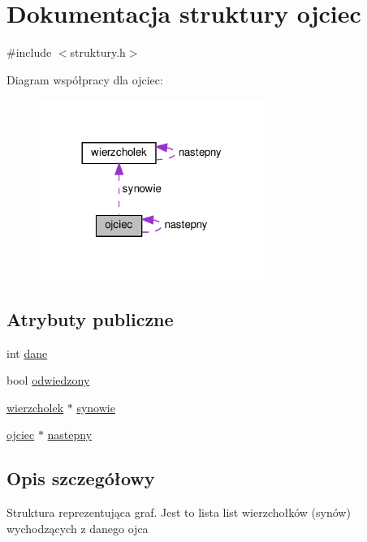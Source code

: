 \hypertarget{structojciec}{}\section{Dokumentacja struktury ojciec}
\label{structojciec}


{\ttfamily \#include $<$struktury.\+h$>$}



Diagram współpracy dla ojciec\+:\nopagebreak
\begin{figure}[H]
\begin{center}
\leavevmode
\includegraphics[width=209pt]{structojciec__coll__graph}
\end{center}
\end{figure}
\subsection*{Atrybuty publiczne}
\begin{DoxyCompactItemize}
\item 
int \hyperlink{structojciec_a00cd793091881a3fe5244e47248c674e}{dane}
\item 
bool \hyperlink{structojciec_ab6946ed8062440756408c1608c9614da}{odwiedzony}
\item 
\hyperlink{structwierzcholek}{wierzcholek} $\ast$ \hyperlink{structojciec_a73c0e6fc33374aea30d4b54a0a636d04}{synowie}
\item 
\hyperlink{structojciec}{ojciec} $\ast$ \hyperlink{structojciec_a80e11ec3ccb56da59f2145a171e8e436}{nastepny}
\end{DoxyCompactItemize}


\subsection{Opis szczegółowy}
Struktura reprezentująca graf. Jest to lista list wierzchołków (synów) wychodzących z danego ojca 

